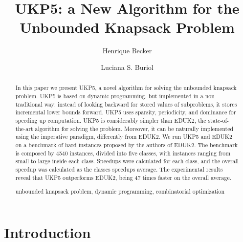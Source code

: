 \documentclass[runningheads,a4paper]{llncs}
\newcommand{\keywords}[1]{\par\addvspace\baselineskip
\noindent\keywordname\enspace\ignorespaces#1}
\begin{document}
\mainmatter  %

\title{UKP5: a New Algorithm for the Unbounded Knapsack Problem}


\author{Henrique Becker \and Luciana S. Buriol}


\maketitle

\begin{abstract}
In this paper we present UKP5, a novel algorithm for solving the unbounded knapsack problem. 
UKP5 is based on dynamic programming, but implemented in a non traditional way: instead of looking backward for stored values of subproblems, 
it stores incremental lower bounds forward. 
UKP5 uses sparsity, periodicity, and dominance for speeding up computation. 
UKP5 is considerably simpler than EDUK2, the state-of-the-art algorithm for solving the problem. 
Moreover, it can be naturally implemented using the imperative paradigm, differently from EDUK2. 
We run UKP5 and EDUK2 on a benchmark of hard instances proposed by the authors of EDUK2. 
The benchmark is composed by 4540 instances, divided into five classes, with instances ranging from small to large inside each class. 
Speedups were calculated for each class, and the overall speedup was calculated as the classes speedups average. 
The experimental results reveal that UKP5 outperforms EDUK2, being 47 times faster on the overall average.
\keywords{unbounded knapsack problem, dynamic programming, combinatorial optimization}
\end{abstract}

\section{Introduction}
\end{document}
